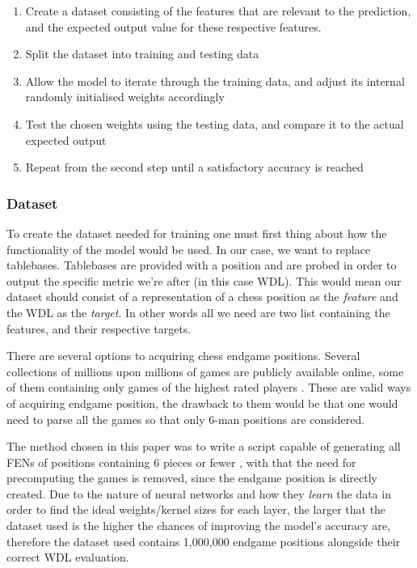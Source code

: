 \begin{enumerate}
    \item Create a dataset consisting of the features that are relevant to the prediction, and the expected output value for these respective features.
    \item Split the dataset into training and testing data
    \item Allow the model to iterate through the training data, and adjust its internal randomly initialised weights accordingly
    \item Test the chosen weights using the testing data, and compare it to the actual expected output
    \item Repeat from the second step until a satisfactory accuracy is reached
\end{enumerate}

\subsubsection{Dataset}
To create the dataset needed for training one must first thing about how the functionality of the model would be used. In our case, we want to replace tablebases. Tablebases are provided with a position and are probed in order to output the specific metric we're after (in this case WDL). This would mean our dataset should consist of a representation of a chess position as the \textit{feature} and the WDL as the \textit{target}. In other words all we need are two list containing the features, and their respective targets.

There are several options to acquiring chess endgame positions. Several collections of millions upon millions of games are publicly available online, some of them containing only games of the highest rated players \cite{liDB}\cite{liEliteDB}. These are valid ways of acquiring endgame position, the drawback to them would be that one would need to parse all the games so that only 6-man positions are considered.

The method chosen in this paper was to write a script capable of generating all FENs of positions containing 6 pieces or fewer \cite{FEN}, with that the need for precomputing the games is removed, since the endgame position is directly created. Due to the nature of neural networks and how they \textit{learn} the data in order to find the ideal weights/kernel sizes for each layer, the larger that the dataset used is the higher the chances of improving the model's accuracy are, therefore the dataset used contains 1,000,000 endgame positions alongside their correct WDL evaluation.

